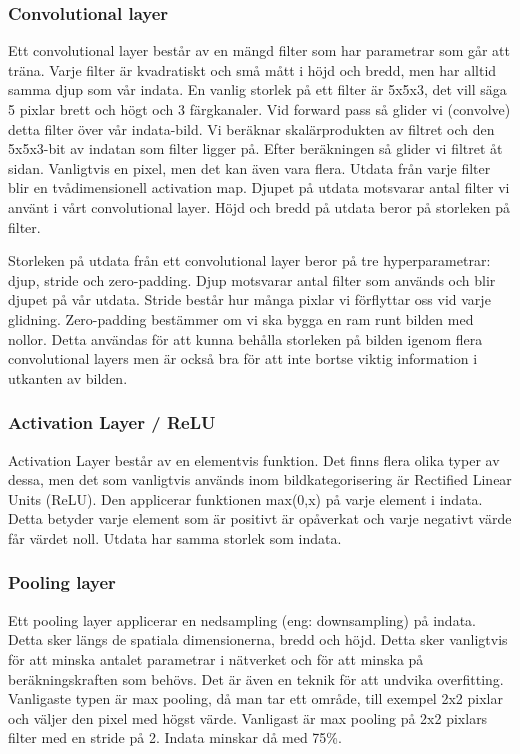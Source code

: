 \documentclass{kththesis}
\begin{document}
      \subsubsection{Convolutional layer}
      Ett convolutional layer består av en mängd filter som har parametrar som går att träna.
      Varje filter är kvadratiskt och små mått i höjd och bredd, men har alltid samma djup som vår indata.
      En vanlig storlek på ett filter är 5x5x3, det vill säga 5 pixlar brett och högt och 3 färgkanaler.
      Vid forward pass så glider vi (convolve) detta filter över vår indata-bild.
      Vi beräknar skalärprodukten av filtret och den 5x5x3-bit av indatan som filter ligger på.
      Efter beräkningen så glider vi filtret åt sidan.
      Vanligtvis en pixel, men det kan även vara flera.
      Utdata från varje filter blir en tvådimensionell activation map.
      Djupet på utdata motsvarar antal filter vi använt i vårt convolutional layer.
      Höjd och bredd på utdata beror på storleken på filter.

      Storleken på utdata från ett convolutional layer beror på tre hyperparametrar: djup, stride och zero-padding.
      Djup motsvarar antal filter som används och blir djupet på vår utdata.
      Stride består hur många pixlar vi förflyttar oss vid varje glidning. 
      Zero-padding bestämmer om vi ska bygga en ram runt bilden med nollor.
      Detta användas för att kunna behålla storleken på bilden igenom flera convolutional layers men är också bra för att inte bortse viktig information i utkanten av bilden.

      \subsubsection{Activation Layer / ReLU}
      Activation Layer består av en elementvis funktion.
      Det finns flera olika typer av dessa, men det som vanligtvis används inom bildkategorisering är Rectified Linear Units (ReLU). 
      Den applicerar funktionen max(0,x) på varje element i indata.
      Detta betyder varje element som är positivt är opåverkat och varje negativt värde får värdet noll.
      Utdata har samma storlek som indata.

      \subsubsection{Pooling layer}
      Ett pooling layer applicerar en nedsampling (eng: downsampling) på indata.
      Detta sker längs de spatiala dimensionerna, bredd och höjd.
      Detta sker vanligtvis för att minska antalet parametrar i nätverket och för att minska på beräkningskraften som behövs.
      Det är även en teknik för att undvika overfitting.
      Vanligaste typen är max pooling, då man tar ett område, till exempel 2x2 pixlar och väljer den pixel med högst värde.
      Vanligast är max pooling på 2x2 pixlars filter med en stride på 2. Indata minskar då med 75\%.
\end{document}
